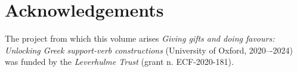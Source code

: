 \documentclass[output=paper,colorlinks,citecolor=brown]{langscibook}
\begin{document}





\section*{Acknowledgements}
The project from which this volume arises \textit{Giving gifts and doing favours: Unlocking Greek support-verb constructions} (University of Oxford, 2020–-2024) was funded by the \textit{Leverhulme Trust} (grant n. ECF-2020-181).



\sloppy
\printbibliography[heading=subbibliography,notkeyword=this]
\end{document}
